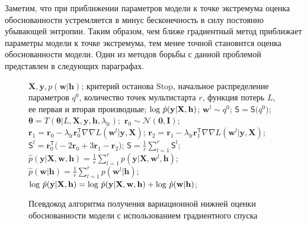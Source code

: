 Заметим, что при приближении параметров модели к точке экстремума оценка обоснованности устремляется в минус бесконечность в силу постоянно убывающей энтропии. Таким образом, чем ближе градиентный метод приближает параметры модели к точке экстремума, тем менее точной становится оценка обоснованности модели. Один из методов борьбы с данной проблемой представлен в следующих параграфах.
\begin{figure}
\begin{algorithmic}[1]
\REQUIRE $\mathbf{X}, \mathbf{y}, p(\mathbf{w}|\mathbf{h})$;
\REQUIRE критерий останова $\text{Stop}$, начальное распределение параметров $q^0$, количество точек мультистарта $r$, функция потерь $L$, ее первая и вторая производные;
\ENSURE $\textnormal{log}~\hat{p}(\mathbf{y}|\mathbf{X}, \mathbf{h})$;
\STATE $\mathbf{w}^l \sim q^0$;
\ENDFOR
\STATE $\mathsf{S} = \mathsf{S}\bigl(q^0)$;
\STATE $\boldsymbol{\theta} = T( \boldsymbol{\theta}| L,\mathbf{X},  \mathbf{y},  \mathbf{h}, {\lambda_{\text{lr}}});$
\STATE $\mathbf{r}_0 \sim \mathcal{N}(\mathbf{0}, \mathbf{I})$;
\STATE $\mathbf{r}_1 = \mathbf{r}_0 - \lambda_{\text{lr}} \mathbf{r}^{\mathsf{T}}_0 \nabla \nabla L(\mathbf{w}^l| \mathbf{y}, \mathbf{X})$;
\STATE $\mathbf{r}_2 = \mathbf{r}_1 - \lambda_{\text{lr}} \mathbf{r}^{\mathsf{T}}_1 \nabla \nabla L(\mathbf{w}^l| \mathbf{y}, \mathbf{X})$;
\STATE $\mathsf{S}^l = \mathbf{r}_0^\mathsf{T}\bigl(-2\mathbf{r}_0 + 3\mathbf{r}_1 -\mathbf{r}_2\bigr)$;
\ENDFOR
\STATE $\mathsf{S} = \frac{1}{r}\sum_{l=1}^r \mathsf{S}^l$;
\ENDWHILE
\STATE $\hat{p}(\mathbf{y}|\mathbf{X}, \mathbf{w}, \mathbf{h}) = \frac{1}{r}\sum_{l=1}^r p(\mathbf{y}|\mathbf{X}, \mathbf{w}^l, \mathbf{h})$;
\STATE $\hat{p}(\mathbf{w} | \mathbf{h}) = \frac{1}{r}\sum_{l=1}^r p(\mathbf{w}^l| \mathbf{h})$;
\STATE $\textnormal{log}~\hat{p}(\mathbf{y}|\mathbf{X}, \mathbf{h}) = \textnormal{log}~\hat{p}(\mathbf{y}|\mathbf{X}, \mathbf{w}, \mathbf{h}) +\textnormal{log}~\hat{p}(\mathbf{w} | \mathbf{h})$;
	
\end{algorithmic}
\caption{Псевдокод алгоритма получения вариационной нижней оценки обоснованности модели с использованием градиентного спуска}
\label{fig:algo}

\end{figure}



